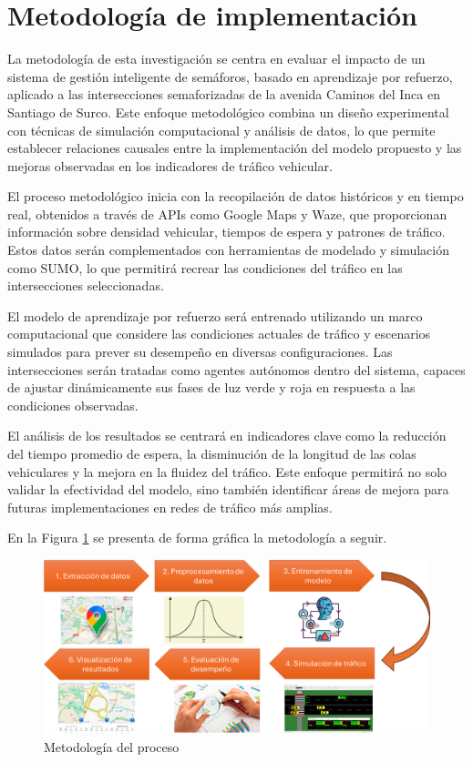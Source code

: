 \section{Metodología de implementación}

La metodología de esta investigación se centra en evaluar el impacto de un sistema de gestión inteligente de semáforos, basado en aprendizaje por refuerzo, aplicado a las intersecciones semaforizadas de la avenida Caminos del Inca en Santiago de Surco. Este enfoque metodológico combina un diseño experimental con técnicas de simulación computacional y análisis de datos, lo que permite establecer relaciones causales entre la implementación del modelo propuesto y las mejoras observadas en los indicadores de tráfico vehicular.

El proceso metodológico inicia con la recopilación de datos históricos y en tiempo real, obtenidos a través de APIs como Google Maps y Waze, que proporcionan información sobre densidad vehicular, tiempos de espera y patrones de tráfico. Estos datos serán complementados con herramientas de modelado y simulación como SUMO, lo que permitirá recrear las condiciones del tráfico en las intersecciones seleccionadas.

El modelo de aprendizaje por refuerzo será entrenado utilizando un marco computacional que considere las condiciones actuales de tráfico y escenarios simulados para prever su desempeño en diversas configuraciones. Las intersecciones serán tratadas como agentes autónomos dentro del sistema, capaces de ajustar dinámicamente sus fases de luz verde y roja en respuesta a las condiciones observadas.

El análisis de los resultados se centrará en indicadores clave como la reducción del tiempo promedio de espera, la disminución de la longitud de las colas vehiculares y la mejora en la fluidez del tráfico. Este enfoque permitirá no solo validar la efectividad del modelo, sino también identificar áreas de mejora para futuras implementaciones en redes de tráfico más amplias.

En la Figura \ref{metproc} se presenta de forma gráfica la metodología a seguir.

\begin{figure}[H]
    \centering
    \includegraphics[width=1\linewidth]{metodologia.png}
    \caption{Metodología del proceso}
    \label{metproc}
\end{figure}

